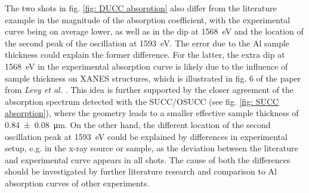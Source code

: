 The two shots in fig. \ref{fig: DUCC absorption} also differ from the literature example in the magnitude of the absorption coefficient, with the experimental curve being on average lower, as well as in the dip at \SI{1568}{\electronvolt} and the location of the second peak of the oscillation at \SI{1593}{\electronvolt}. The error due to the Al sample thickness could explain the former difference. For the latter, the extra dip at \SI{1568}{\electronvolt} in the experimental absorption curve is likely due to the influence of sample thickness on XANES structures, which is illustrated in fig. 6 of the paper from \textit{Levy et al.} \citep{levy2010double}. This idea is further supported by the closer agreement of the absorption spectrum detected with the SUCC/OSUCC (see fig. \ref{fig: SUCC absorption}), where the geometry leads to a smaller effective sample thickness of \SI{0.84\pm0.08}{\micro\meter}. On the other hand, the different location of the second oscillation peak at \SI{1593}{\electronvolt} could be explained by differences in experimental setup, e.g. in the x-ray source or sample, as the deviation between the literature and experimental curve appears in all shots. The cause of both the differences should be investigated by further literature research and comparison to Al absorption curves of other experiments.

